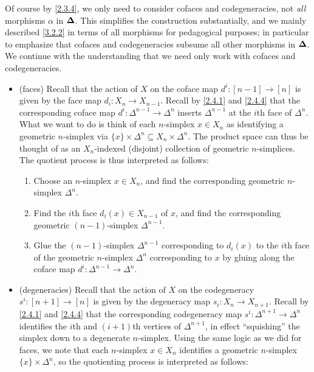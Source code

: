 \begin{remark}\label{3.2.3}
    Of course by \cref{2.3.4}, we only need to consider cofaces and codegeneracies, not \emph{all} morphisms $\alpha$ in $\boldsymbol{\Delta}$. This simplifies the construction substantially, and we mainly described \cref{3.2.2} in terms of all morphisms for pedagogical purposes; in particular to emphasize that cofaces and codegeneracies subsume all other morphisms in $\boldsymbol{\Delta}$. We continue with the understanding that we need only work with cofaces and codegeneracies.
    \begin{itemize}
        \item (faces) Recall that the action of $X$ on the coface map $d^i : [n-1]\to[n]$ is given by the face map $d_i : X_n\to X_{n-1}$. Recall by \cref{2.4.1} and \cref{2.4.4} that the corresponding coface map $d^i:\Delta^{n-1}\to\Delta^{n}$ inserts $\Delta^{n-1}$ at the $i$th face of $\Delta^n$. What we want to do is think of each $n$-simplex $x\in X_n$ as identifying a geometric $n$-simplex via $\{x\}\times \Delta^n\subseteq X_n\times\Delta^n$. The product space can thus be thought of as an $X_n$-indexed (disjoint) collection of geometric $n$-simplices. The quotient process is thus interpreted as follows:
        \begin{enumerate}
            \item Choose an $n$-simplex $x\in X_n$, and find the corresponding geometric $n$-simplex $\Delta^n$.
            \item Find the $i$th face $d_i(x)\in X_{n-1}$ of $x$, and find the corresponding geometric $(n-1)$-simplex $\Delta^{n-1}$.
            \item Glue the $(n-1)$-simplex $\Delta^{n-1}$ corresponding to $d_i(x)$ to the $i$th face of the geometric $n$-simplex $\Delta^n$ corresponding to $x$ by gluing along the coface map $d^i : \Delta^{n-1}\to\Delta^n$.
        \end{enumerate}
        \item (degeneracies) Recall that the action of $X$ on the codegeneracy $s^i : [n+1]\to[n]$ is given by the degeneracy map $s_i : X_n\to X_{n+1}$. Recall by \cref{2.4.1} and \cref{2.4.4} that the corresponding codegeneracy map $s^i : \Delta^{n+1}\to\Delta^n$ identifies the $i$th and $(i+1)$th vertices of $\Delta^{n+1}$, in effect ``squishing'' the simplex down to a degenerate $n$-simplex. Using the same logic as we did for faces, we note that each $n$-simplex $x\in X_n$ identifies a geometric $n$-simplex $\{x\}\times\Delta^n$, so the quotienting process is interpreted as follows:
        \begin{enumerate}

\end{enumerate}
\end{itemize}
\end{remark}
